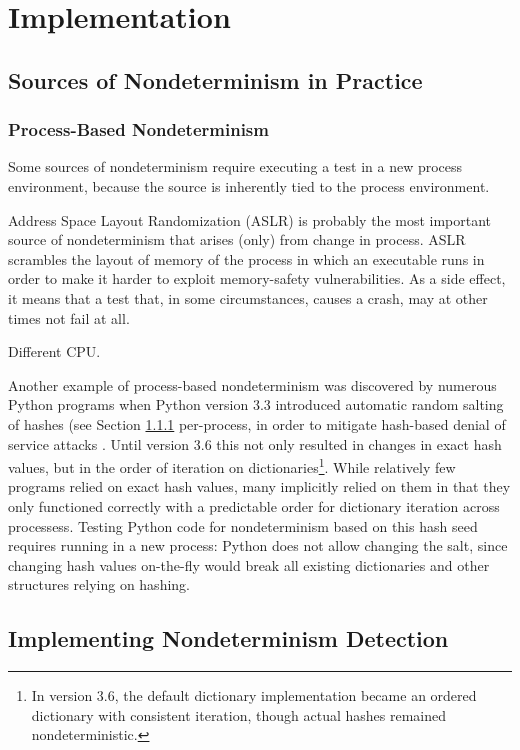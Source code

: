 \section{Implementation}

\subsection{Sources of Nondeterminism in Practice}

\subsubsection{Process-Based Nondeterminism}

\label{sec:pnondet}

Some sources of nondeterminism require executing a test in a new
process environment, because the source is inherently tied to the
process environment.

Address Space Layout Randomization (ASLR) \cite{ASLR}  is probably the most
important source of nondeterminism that arises (only) from change in
process.  ASLR scrambles the layout of memory of the process in which
an executable runs in order to make it
harder to exploit memory-safety vulnerabilities.  As a side effect, it
means that a test that, in some circumstances, causes a crash, may at
other times not fail at all.

Different CPU.

Another example of process-based nondeterminism was discovered by numerous Python programs when Python
version 3.3 introduced automatic random salting of hashes (see Section
\ref{sec:pnondet} per-process,
in order to mitigate hash-based denial of service attacks
\cite{denial}.  Until version 3.6 this not only resulted in changes in
exact hash values, but in the order of iteration on
dictionaries\footnote{In version 3.6, the default dictionary
  implementation became an ordered dictionary with consistent
  iteration, though actual hashes remained nondeterministic.}.  While
relatively few programs relied on exact hash values, many implicitly
relied on them in that they only functioned correctly with a
predictable order for dictionary iteration across processess.  Testing
Python code for nondeterminism based on this hash seed requires
running in a new process:  Python does not allow changing the salt, since changing hash values on-the-fly would
break all existing dictionaries and other structures relying on hashing.

\subsection{Implementing Nondeterminism Detection}


